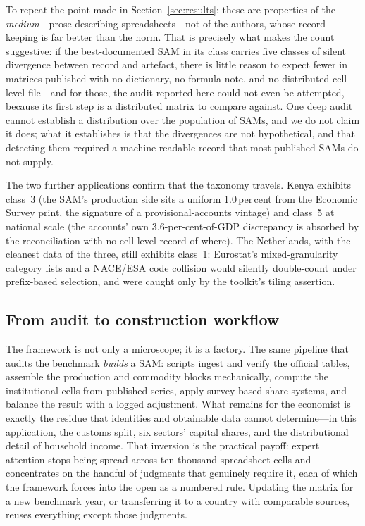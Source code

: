 To repeat the point made in Section~\ref{sec:results}: these are properties
of the \emph{medium}---prose describing spreadsheets---not of the authors,
whose record-keeping is far better than the norm. That is precisely what
makes the count suggestive: if the best-documented SAM in its class
carries five classes of silent divergence between record and artefact,
there is little reason to expect fewer in matrices published with no
dictionary, no formula note, and no distributed cell-level file---and for
those, the audit reported here could not even be attempted, because its
first step is a distributed matrix to compare against. One deep audit
cannot establish a distribution over the population of SAMs, and we do not
claim it does; what it establishes is that the divergences are not
hypothetical, and that detecting them required a machine-readable record
that most published SAMs do not supply.

The two further applications confirm that the taxonomy travels. Kenya
exhibits class~3 (the SAM's production side sits a uniform 1.0\,per\,cent
from the Economic Survey print, the signature of a provisional-accounts
vintage) and class~5 at national scale (the accounts' own
3.6-per-cent-of-GDP discrepancy is absorbed by the reconciliation with no
cell-level record of where). The Netherlands, with the cleanest data of
the three, still exhibits class~1: Eurostat's mixed-granularity category
lists and a NACE/ESA code collision would silently double-count under
prefix-based selection, and were caught only by the toolkit's tiling
assertion.

\subsection{From audit to construction workflow}
\label{sec:discussion:workflow}

The framework is not only a microscope; it is a factory. The same pipeline
that audits the benchmark \emph{builds} a SAM: scripts ingest and verify
the official tables, assemble the production and commodity blocks
mechanically, compute the institutional cells from published series,
apply survey-based share systems, and balance the result with a logged
adjustment. What remains for the economist is exactly the residue that
identities and obtainable data cannot determine---in this application, the
customs split, six sectors' capital shares, and the distributional detail
of household income. That inversion is the practical payoff: expert
attention stops being spread across ten thousand spreadsheet cells and
concentrates on the handful of judgments that genuinely require it, each
of which the framework forces into the open as a numbered rule. Updating
the matrix for a new benchmark year, or transferring it to a country with
comparable sources, reuses everything except those judgments.

